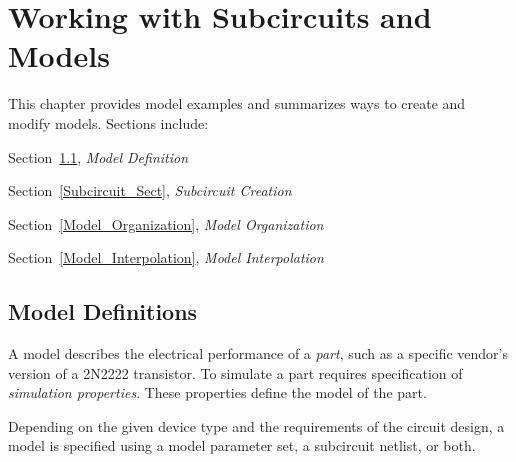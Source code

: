 


\chapter{Working with Subcircuits and Models}
\label{Models}

{
This chapter provides model examples and summarizes ways to create and
modify models.  Sections include:
\begin{XyceItemize}
\item Section~\ref{Model_Def}, {\em Model Definition}
\item Section~\ref{Subcircuit_Sect}, {\em Subcircuit Creation}
\item Section~\ref{Model_Organization}, {\em Model Organization}
\item Section~\ref{Model_Interpolation}, {\em Model Interpolation}
\end{XyceItemize}
}

\section{Model Definitions}
\label{Model_Def}

A model describes the electrical performance of a {\em part}, such as
a specific vendor's version of a 2N2222 transistor.  To simulate a
part requires specification of {\em simulation properties}.  
These properties define the model of the part.

Depending on the given device type and the requirements of the circuit
design, a model is specified using a model parameter set, a subcircuit
netlist, or both.

